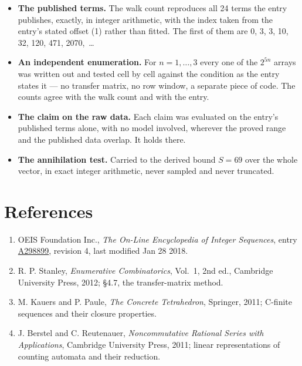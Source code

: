 \documentclass[11pt]{article}
\theoremstyle{definition}
\begin{document}
\begin{itemize}

\item {\bfseries The published terms.} The walk count reproduces all 24 terms the entry publishes, exactly, in integer arithmetic, with the index taken from the entry's stated offset (1) rather than fitted. The first of them are 0, 3, 3, 10, 32, 120, 471, 2070,~\dots

\item {\bfseries An independent enumeration.} For $n = 1,\dots,3$ every one of the $2^{5n}$ arrays was written out and tested cell by cell against the condition as the entry states it --- no transfer matrix, no row window, a separate piece of code. The counts agree with the walk count and with the entry.

\item {\bfseries The claim on the raw data.} Each claim was evaluated on the entry's published terms alone, with no model involved, wherever the proved range and the published data overlap. It holds there.

\item {\bfseries The annihilation test.} Carried to the derived bound $S = 69$ over the whole vector, in exact integer arithmetic, never sampled and never truncated.

\end{itemize}

\section{References}

\begin{enumerate}

\item OEIS Foundation Inc., \emph{The On-Line Encyclopedia of Integer Sequences}, entry \href{https://oeis.org/A298899}{A298899}, revision 4, last modified Jan 28 2018.

\item R. P. Stanley, \emph{Enumerative Combinatorics}, Vol.~1, 2nd ed., Cambridge University Press, 2012; \S4.7, the transfer-matrix method.

\item M. Kauers and P. Paule, \emph{The Concrete Tetrahedron}, Springer, 2011; C-finite sequences and their closure properties.

\item J. Berstel and C. Reutenauer, \emph{Noncommutative Rational Series with Applications}, Cambridge University Press, 2011; linear representations of counting automata and their reduction.

\end{enumerate}
\end{document}
